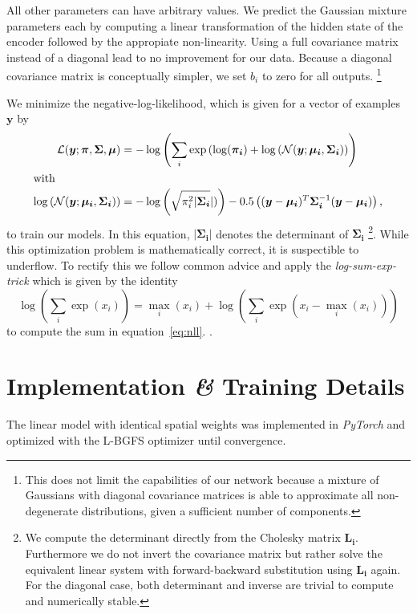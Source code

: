 \documentclass[nobib]{tufte-handout}
\begin{document}
All other parameters can have arbitrary values.
We predict the Gaussian mixture parameters each by computing a linear transformation of the hidden state of the encoder followed by the appropiate non-linearity.
Using a full covariance matrix instead of a diagonal lead to no improvement for our data.
Because a diagonal covariance matrix is conceptually simpler, we set \(b_i\) to zero for all outputs.%
\footnote{This does not limit the capabilities of our network because a mixture of Gaussians with diagonal covariance matrices is able to approximate all non-degenerate distributions,
  given a sufficient number of components.}

We minimize the negative-log-likelihood, which is given for a vector of examples \(\bm{y}\) by
\begin{align}
  \label{eq:nll}
 \mathcal{L} (\bm{y}; \bm{\pi}, \bm{\Sigma}, \bm{\mu}) &= - \log \left(  \sum_i \exp \left( \log (\bm{\pi_i}) + \log \left( \mathcal{N} (\bm{y}; \bm{\mu_i}, \bm{\Sigma_i} \right) \right) \right) \\ 
  \intertext{with}
  \log \left( \mathcal{N} (\bm{y}; \bm{\mu_i}, \bm{\Sigma_i}) \right) &= 
 -\log \left( \sqrt{\pi_i^2 \vert \bm{\Sigma_i}} \vert)  \right) - 0.5 \left( (\bm{y} - \bm{\mu_i})^T \bm{\Sigma_i}^{-1} (\bm{y} - \bm{\mu_i}) \right),\nonumber
\end{align}
to train our models.
In this equation, \(\vert \bm{\Sigma_i} \vert\) denotes the determinant of \(\bm{\Sigma_i}\)%
\footnote{We compute the determinant directly from the Cholesky matrix \(\bm{L_i}\).
  Furthermore we do not invert the covariance matrix but rather solve the equivalent linear system with forward-backward substitution using \(\bm{L_i}\) again.
For the diagonal case, both determinant and inverse are trivial to compute and numerically stable.}.
While this optimization problem is mathematically correct, it is suspectible to underflow.
To rectify this we follow common advice and apply the \textit{log-sum-exp-trick} which is given by the identity
\begin{equation*}
  \log \left( \sum_i \exp (x_i) \right) = \max_i (x_i) + \log \left( \sum_i \exp (x_i - \max_i (x_i)) \right)
\end{equation*}
to compute the sum in equation~\ref{eq:nll}\autocite{mdnMaster}. .

\section{Implementation \textit{\&} Training Details}
The linear model with identical spatial weights was implemented in \textit{PyTorch} and optimized with the \textsc{L-BGFS} optimizer until convergence.
\end{document}
